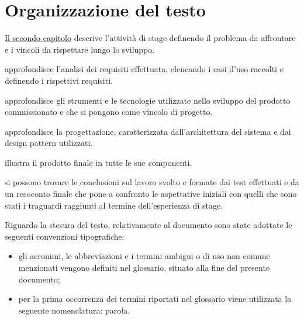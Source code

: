 \section{Organizzazione del testo}


{\hyperref[cap:descrizione-stage]{Il secondo capitolo}} descrive l'attività di stage definendo il problema da affrontare e i vincoli da rispettare lungo lo sviluppo.
    
 approfondisce l'analisi dei requisiti effettuata, elencando i casi d'uso raccolti e definendo i rispettivi requisiti.
    
 approfondisce gli strumenti e le tecnologie utilizzate nello sviluppo del prodotto commissionato e che si pongono come vincolo di progetto.
    
 approfondisce la progettazione, caratterizzata dall'architettura del sistema e dai design pattern utilizzati.
    
 illustra il prodotto finale in tutte le sue componenti.
    
 si possono trovare le conclusioni sul lavoro svolto e formate dai test effettuati e da un resoconto finale che pone a confronto le aspettative iniziali con quelli che sono stati i traguardi raggiunti al termine dell'esperienza di stage.

\noindent Riguardo la stesura del testo, relativamente al documento sono state adottate le seguenti convenzioni tipografiche:
\begin{itemize}
	\item gli acronimi, le abbreviazioni e i termini ambigui o di uso non comune menzionati vengono definiti nel glossario, situato alla fine del presente documento;
	\item per la prima occorrenza dei termini riportati nel glossario viene utilizzata la seguente nomenclatura: parola\glsfirstoccur.
\end{itemize}
